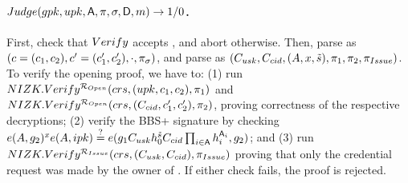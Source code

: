 \paragraph{$Judge(gpk,upk,\mathsf{A},\pi,\sigma,\mathsf{D},m)
  \rightarrow 1/0$.} %
First, check that $Verify$ accepts \sig, and abort otherwise. Then, parse
\sig as $(c=(c_1,c_2),c'=(c'_1,c'_2),\cdot,\pi_\sigma)$, and parse \oproof
as $(C_{usk},C_{cid},(A,x,\tilde{s}),\pi_1,\pi_2,
\pi_{Issue})$. To verify
the opening proof, we have to: (1) run $NIZK.Verify^{\mathcal{R}_{Open}}(crs,
(upk,c_1,c_2),\pi_1)$ and $NIZK.Verify^{\mathcal{R}_{Open}}(crs,
(C_{cid},c'_1,c'_2),\pi_2)$, proving correctness of the respective
decryptions; (2) verify the BBS+ signature by checking $e(A,g_2)^x
e(A,ipk) \stackrel{?}{=} e(g_1C_{usk}h_0^{\tilde{s}}C_{cid}
\prod_{i \in \mathsf{A}}h_i^{\mathsf{A}_i},g_2)$; and (3) run
$NIZK.Verify^{\mathcal{R}_{Issue}}(crs,(C_{usk},C_{cid}),\pi_{Issue})$
proving that only the credential request was made by the owner of \usk. If
either check fails, the proof is rejected.

